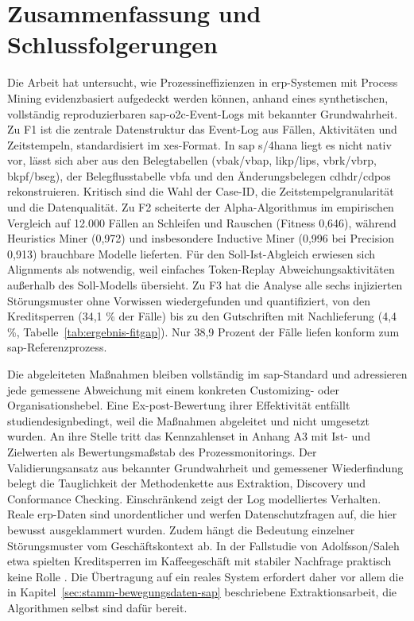 \chapter{Zusammenfassung und Schlussfolgerungen}
\label{ch:zusammenfassung}

Die Arbeit hat untersucht, wie Prozessineffizienzen in \gls{erp}-Systemen mit Process Mining evidenzbasiert aufgedeckt werden können, anhand eines synthetischen, vollständig reproduzierbaren \gls{sap}-\gls{o2c}-Event-Logs mit bekannter Grundwahrheit. Zu F1 ist die zentrale Datenstruktur das Event-Log aus Fällen, Aktivitäten und Zeitstempeln, standardisiert im \gls{xes}-Format. In \gls{sap} \gls{s/4hana} liegt es nicht nativ vor, lässt sich aber aus den Belegtabellen (\gls{vbak}/\gls{vbap}, \gls{likp}/\gls{lips}, \gls{vbrk}/\gls{vbrp}, \gls{bkpf}/\gls{bseg}), der Belegflusstabelle \gls{vbfa} und den Änderungsbelegen \gls{cdhdr}/\gls{cdpos} rekonstruieren. Kritisch sind die Wahl der Case-ID, die Zeitstempelgranularität und die Datenqualität. Zu F2 scheiterte der Alpha-Algorithmus im empirischen Vergleich auf 12.000 Fällen an Schleifen und Rauschen (Fitness 0,646), während Heuristics Miner (0,972) und insbesondere Inductive Miner (0,996 bei Precision 0,913) brauchbare Modelle lieferten. Für den Soll-Ist-Abgleich erwiesen sich Alignments als notwendig, weil einfaches Token-Replay Abweichungsaktivitäten außerhalb des Soll-Modells übersieht. Zu F3 hat die Analyse alle sechs injizierten Störungsmuster ohne Vorwissen wiedergefunden und quantifiziert, von den Kreditsperren (34,1 \% der Fälle) bis zu den Gutschriften mit Nachlieferung (4,4 \%, Tabelle~\ref{tab:ergebnis-fitgap}). Nur 38,9 Prozent der Fälle liefen konform zum \gls{sap}-Referenzprozess.

Die abgeleiteten Maßnahmen bleiben vollständig im \gls{sap}-Standard und adressieren jede gemessene Abweichung mit einem konkreten Customizing- oder Organisationshebel. Eine Ex-post-Bewertung ihrer Effektivität entfällt studiendesignbedingt, weil die Maßnahmen abgeleitet und nicht umgesetzt wurden. An ihre Stelle tritt das Kennzahlenset in Anhang A3 mit Ist- und Zielwerten als Bewertungsmaßstab des Prozessmonitorings. Der Validierungsansatz aus bekannter Grundwahrheit und gemessener Wiederfindung belegt die Tauglichkeit der Methodenkette aus Extraktion, Discovery und Conformance Checking. Einschränkend zeigt der Log modelliertes Verhalten. Reale \gls{erp}-Daten sind unordentlicher und werfen Datenschutzfragen auf, die hier bewusst ausgeklammert wurden. Zudem hängt die Bedeutung einzelner Störungsmuster vom Geschäftskontext ab. In der Fallstudie von Adolfsson/Saleh etwa spielten Kreditsperren im Kaffeegeschäft mit stabiler Nachfrage praktisch keine Rolle \parencite[S.~51]{adolfsson2026o2c}. Die Übertragung auf ein reales System erfordert daher vor allem die in Kapitel~\ref{sec:stamm-bewegungsdaten-sap} beschriebene Extraktionsarbeit, die Algorithmen selbst sind dafür bereit.

